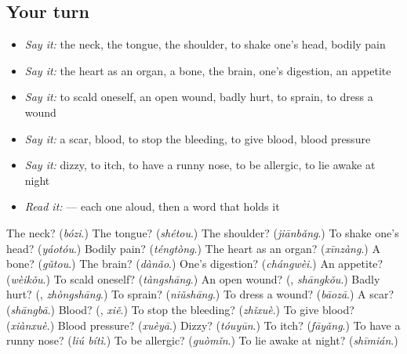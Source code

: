 \subsection*{Your turn}
\begin{itemize}
\raggedright
  \item \emph{Say it:} the neck, the tongue, the shoulder, to shake one's head, bodily pain
  \item \emph{Say it:} the heart as an organ, a bone, the brain, one's digestion, an appetite
  \item \emph{Say it:} to scald oneself, an open wound, badly hurt, to sprain, to dress a wound
  \item \emph{Say it:} a scar, blood, to stop the bleeding, to give blood, blood pressure
  \item \emph{Say it:} dizzy, to itch, to have a runny nose, to be allergic, to lie awake at night
  \item \emph{Read it:}   — each one aloud, then a word that holds it
\end{itemize}

\begin{tcolorbox}[breakable,colback=teal!4,colframe=teal!35!black,title={Before you move on}]
The neck? (\emph{bózi}.) The tongue? (\emph{shétou}.) The shoulder? (\emph{jiānbǎng}.) To shake one's head? (\emph{yáotóu}.) Bodily pain? (\emph{téngtòng}.) The heart as an organ? (\emph{xīnzàng}.) A bone? (\emph{gǔtou}.) The brain? (\emph{dànǎo}.) One's digestion? (\emph{chángwèi}.) An appetite? (\emph{wèikǒu}.) To scald oneself? (\emph{tàngshāng}.) An open wound? (\textbf{}, \emph{shāngkǒu}.) Badly hurt? (\textbf{}, \emph{zhòngshāng}.) To sprain? (\emph{niǔshāng}.) To dress a wound? (\emph{bāozā}.) A scar? (\emph{shāngbā}.) Blood? (\textbf{}, \emph{xiě}.) To stop the bleeding? (\emph{zhǐxuè}.) To give blood? (\emph{xiànxuè}.) Blood pressure? (\emph{xuèyā}.) Dizzy? (\emph{tóuyūn}.) To itch? (\emph{fāyǎng}.) To have a runny nose? (\emph{liú bítì}.) To be allergic? (\emph{guòmǐn}.) To lie awake at night? (\emph{shīmián}.)
\end{tcolorbox}
